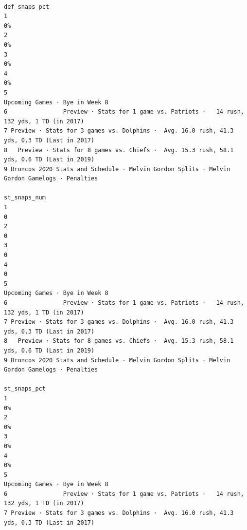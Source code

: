 \documentclass[
]{article}
\begin{document}
\begin{verbatim}
                                                                                def_snaps_pct
1                                                                                          0%
2                                                                                          0%
3                                                                                          0%
4                                                                                          0%
5                                                              Upcoming Games · Bye in Week 8
6                Preview · Stats for 1 game vs. Patriots ·   14 rush, 132 yds, 1 TD (in 2017)
7 Preview · Stats for 3 games vs. Dolphins ·  Avg. 16.0 rush, 41.3 yds, 0.3 TD (Last in 2017)
8   Preview · Stats for 8 games vs. Chiefs ·  Avg. 15.3 rush, 58.1 yds, 0.6 TD (Last in 2019)
9 Broncos 2020 Stats and Schedule · Melvin Gordon Splits · Melvin Gordon Gamelogs · Penalties
                                                                                 st_snaps_num
1                                                                                           0
2                                                                                           0
3                                                                                           0
4                                                                                           0
5                                                              Upcoming Games · Bye in Week 8
6                Preview · Stats for 1 game vs. Patriots ·   14 rush, 132 yds, 1 TD (in 2017)
7 Preview · Stats for 3 games vs. Dolphins ·  Avg. 16.0 rush, 41.3 yds, 0.3 TD (Last in 2017)
8   Preview · Stats for 8 games vs. Chiefs ·  Avg. 15.3 rush, 58.1 yds, 0.6 TD (Last in 2019)
9 Broncos 2020 Stats and Schedule · Melvin Gordon Splits · Melvin Gordon Gamelogs · Penalties
                                                                                 st_snaps_pct
1                                                                                          0%
2                                                                                          0%
3                                                                                          0%
4                                                                                          0%
5                                                              Upcoming Games · Bye in Week 8
6                Preview · Stats for 1 game vs. Patriots ·   14 rush, 132 yds, 1 TD (in 2017)
7 Preview · Stats for 3 games vs. Dolphins ·  Avg. 16.0 rush, 41.3 yds, 0.3 TD (Last in 2017)

\end{verbatim}
\end{document}
